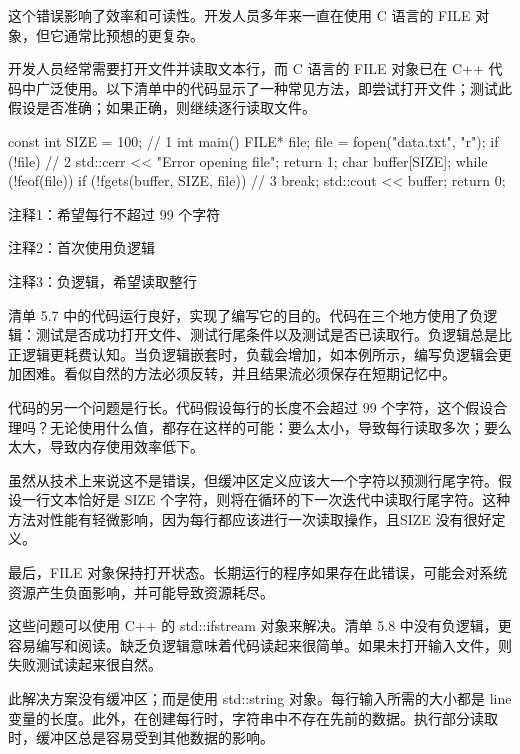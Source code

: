 这个错误影响了效率和可读性。开发人员多年来一直在使用 C 语言的 FILE 对象，但它通常比预想的更复杂。


开发人员经常需要打开文件并读取文本行，而 C 语言的 FILE 对象已在 C++ 代码中广泛使用。以下清单中的代码显示了一种常见方法，即尝试打开文件；测试此假设是否准确；如果正确，则继续逐行读取文件。


\begin{cpp}
const int SIZE = 100; // 1
int main() {
  FILE* file;
  file = fopen("data.txt", "r");
  if (!file) { // 2
    std::cerr << "Error opening file\n";
    return 1;
  }
  char buffer[SIZE];
  while (!feof(file)) {
    if (!fgets(buffer, SIZE, file)) // 3
      break;
    std::cout << buffer;
  }
  return 0;
}
\end{cpp}

{\footnotesize
注释1：希望每行不超过 99 个字符

注释2：首次使用负逻辑

注释3：负逻辑，希望读取整行
}


清单 5.7 中的代码运行良好，实现了编写它的目的。代码在三个地方使用了负逻辑：测试是否成功打开文件、测试行尾条件以及测试是否已读取行。负逻辑总是比正逻辑更耗费认知。当负逻辑嵌套时，负载会增加，如本例所示，编写负逻辑会更加困难。看似自然的方法必须反转，并且结果流必须保存在短期记忆中。

代码的另一个问题是行长。代码假设每行的长度不会超过 99 个字符，这个假设合理吗？无论使用什么值，都存在这样的可能：要么太小，导致每行读取多次；要么太大，导致内存使用效率低下。

虽然从技术上来说这不是错误，但缓冲区定义应该大一个字符以预测行尾字符。假设一行文本恰好是 SIZE 个字符，则将在循环的下一次迭代中读取行尾字符。这种方法对性能有轻微影响，因为每行都应该进行一次读取操作，且SIZE 没有很好定义。

最后，FILE 对象保持打开状态。长期运行的程序如果存在此错误，可能会对系统资源产生负面影响，并可能导致资源耗尽。


这些问题可以使用 C++ 的 std::ifstream 对象来解决。清单 5.8 中没有负逻辑，更容易编写和阅读。缺乏负逻辑意味着代码读起来很简单。如果未打开输入文件，则失败测试读起来很自然。

此解决方案没有缓冲区；而是使用 std::string 对象。每行输入所需的大小都是 line 变量的长度。此外，在创建每行时，字符串中不存在先前的数据。执行部分读取时，缓冲区总是容易受到其他数据的影响。

